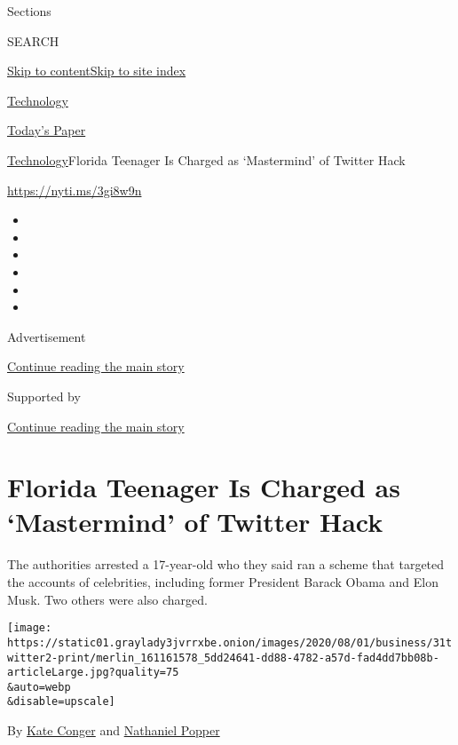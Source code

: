 Sections

SEARCH

\protect\hyperlink{site-content}{Skip to
content}\protect\hyperlink{site-index}{Skip to site index}

\href{https://www.nytimes3xbfgragh.onion/section/technology}{Technology}

\href{https://myaccount.nytimes3xbfgragh.onion/auth/login?response_type=cookie\&client_id=vi}{}

\href{https://www.nytimes3xbfgragh.onion/section/todayspaper}{Today's
Paper}

\href{/section/technology}{Technology}\textbar{}Florida Teenager Is
Charged as `Mastermind' of Twitter Hack

\href{https://nyti.ms/3gi8w9n}{https://nyti.ms/3gi8w9n}

\begin{itemize}
\item
\item
\item
\item
\item
\item
\end{itemize}

Advertisement

\protect\hyperlink{after-top}{Continue reading the main story}

Supported by

\protect\hyperlink{after-sponsor}{Continue reading the main story}

\hypertarget{florida-teenager-is-charged-as-mastermind-of-twitter-hack}{%
\section{Florida Teenager Is Charged as `Mastermind' of Twitter
Hack}\label{florida-teenager-is-charged-as-mastermind-of-twitter-hack}}

The authorities arrested a 17-year-old who they said ran a scheme that
targeted the accounts of celebrities, including former President Barack
Obama and Elon Musk. Two others were also charged.

\texttt{[image: https://static01.graylady3jvrrxbe.onion/images/2020/08/01/business/31twitter2-print/merlin\_161161578\_5dd24641-dd88-4782-a57d-fad4dd7bb08b-articleLarge.jpg?quality=75\\\&auto=webp\\\&disable=upscale]}

By \href{https://www.nytimes3xbfgragh.onion/by/kate-conger}{Kate Conger}
and
\href{https://www.nytimes3xbfgragh.onion/by/nathaniel-popper}{Nathaniel
Popper}

